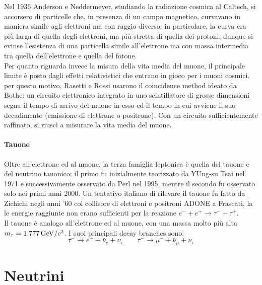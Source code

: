 Nel 1936 Anderson e Neddermeyer, studiando la radiazione cosmica al Caltech, si accorsero di particelle che, in presenza di un campo magnetico, curvavano in maniera simile agli elettroni ma con raggio diverso: in particolare, la curva era più larga di quella degli elettroni, ma più stretta di quella dei protoni, dunque si evinse l'esistenza di una particella simile all'elettrone ma con massa intermedia tra quella dell'elettrone e quella del fotone.\\
Per quanto riguarda invece la misura della vita media del muone, il principale limite è posto dagli effetti relativistici che entrano in gioco per i muoni cosmici. per questo motivo, Rasetti e Rossi usarono il coincidence method ideato da Bothe: un circuito elettronico integrato in uno scintillatore di grosse dimensioni segna il tempo di arrivo del muone in esso ed il tempo in cui avviene il suo decadimento (emissione di elettrone o positrone). Con un circuito sufficientemente raffinato, si riuscì a misurare la vita media del muone.

\paragraph{Tauone}

Oltre all'elettrone ed al muone, la terza famiglia leptonica è quella del tauone e del neutrino tauonico: il primo fu inizialmente teorizzato da YUng-su Tsai nel 1971 e successivamente osservato da Perl nel 1995, mentre il secondo fu osservato solo nei primi anni 2000. Un tentativo italiano di rilevare il tauone fu fatto da Zichichi negli anni '60 col collisore di elettroni e positroni ADONE a Frascati, la le energie raggiunte non erano sufficienti per la reazione $ e^- + e^+ \rightarrow \tau^- + \tau^+ $.\\
Il tauone è analogo all'elettrone ed al muone, con una massa molto più alta $ m_{\tau} = 1.777\,\mathrm{GeV}/c^2 $. I suoi principali decay branches sono:
\begin{equation*}
	\tau^- \rightarrow e^- + \bar{\nu}_e + \nu_{\tau}
	\qquad
	\tau^- \rightarrow \mu^- + \bar{\nu}_{\mu} + \nu_{\tau}
\end{equation*}

\section{Neutrini}

